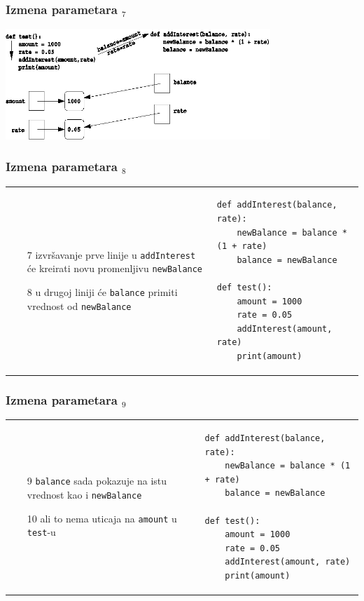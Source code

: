 \documentclass[compress]{beamer}
\begin{document}
\begin{frame}[fragile,shrink=10]
  \frametitle{Izmena parametara $_7$}
\begin{center}
  \includegraphics[width=10cm]{pic09}
\end{center}
\end{frame}

\begin{frame}[fragile,shrink=10]
  \frametitle{Izmena parametara $_8$}
\begin{tabular}{p{4cm}p{8cm}}
  \begin{itemize}
    \item[7] izvršavanje prve linije u \texttt{addInterest} će kreirati novu promenljivu \texttt{newBalance}
    \item[8] u drugoj liniji će \texttt{balance} primiti vrednost od \texttt{newBalance}
  \end{itemize}
&
\begin{verbatim}
def addInterest(balance, rate):
    newBalance = balance * (1 + rate)
    balance = newBalance

def test():
    amount = 1000
    rate = 0.05
    addInterest(amount, rate)
    print(amount)
\end{verbatim}
\end{tabular}
\end{frame}

\begin{frame}[fragile,shrink=10]
  \frametitle{Izmena parametara $_9$}
\begin{tabular}{p{4cm}p{8cm}}
  \begin{itemize}
    \item[9] \texttt{balance} sada pokazuje na istu vrednost kao i \texttt{newBalance}
    \item[10] ali to nema uticaja na \texttt{amount} u \texttt{test}-u
  \end{itemize}
&
\begin{verbatim}
def addInterest(balance, rate):
    newBalance = balance * (1 + rate)
    balance = newBalance

def test():
    amount = 1000
    rate = 0.05
    addInterest(amount, rate)
    print(amount)
\end{verbatim}
\end{tabular}
\end{frame}
\end{document}
